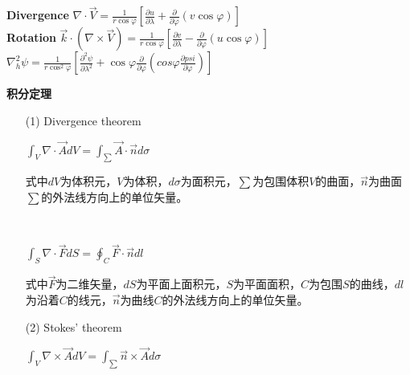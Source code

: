 \documentclass[cn, twoside]{myModel}
\begin{document}
\begin{cnabstract}
\begin{itemize}
\begin{itemize}
				\textbf{Divergence}
				$\nabla\cdot\overrightarrow{V}=\frac{1}{r\cos{\varphi}}[\frac{\partial u}{\partial \lambda}+\frac{\partial}{\partial \varphi}(v\cos{\varphi})]$ \\
				\textbf{Rotation}
				$\overrightarrow{k}\cdot(\nabla\times\overrightarrow{V})=\frac{1}{r\cos{\varphi}}[\frac{\partial v}{\partial \lambda}-\frac{\partial}{\partial \varphi}(u\cos{\varphi})]$ \quad
				$\nabla^2_{h}\psi=\frac{1}{r\cos^2{\varphi}}[\frac{\partial^2 \psi}{\partial \lambda^2}+\cos{\varphi}\frac{\partial}{\partial \varphi}(cos{\varphi}\frac{\partial psi}{\partial \varphi})]$
			\end{itemize}
		\end{itemize}
		\par{}\noindent{}\textcolor{blue!70!black}{\textbf{积分定理}}
			\normalsize
			\begin{itemize}
				\item[(1)] Divergence theorem \\
				\begin{minipage}{6cm}
					\centering
					{$\displaystyle\int_{V} \nabla\cdot\overrightarrow{A}dV=\displaystyle\int_{\sum} \overrightarrow{A}\cdot\overrightarrow{n}d\sigma$}
				\end{minipage}
				\begin{minipage}{9.5cm}
					\raggedright
					{
						式中$dV$为体积元，$V$为体积，$d\sigma$为面积元，$\sum$为包围体积$V$的曲面，$\overrightarrow{n}$为曲面$\sum$的外法线方向上的单位矢量。
					}
				\end{minipage} \\ [.5em]
				\begin{minipage}{6cm}
					\centering
					{$\displaystyle\int_{S}\nabla\cdot\overrightarrow{F}dS
					=\displaystyle\oint_{C} \overrightarrow{F}\cdot\overrightarrow{n}dl$}
				\end{minipage}
				\begin{minipage}{9.5cm}
					\raggedright
					{
						式中$\overrightarrow{F}$为二维矢量，$dS$为平面上面积元，$S$为平面面积，$C$为包围$S$的曲线，$dl$为沿着$C$的线元，$\overrightarrow{n}$为曲线$C$的外法线方向上的单位矢量。
					}
				\end{minipage}
				\item[(2)] Stokes' theorem \\
				\begin{minipage}{6cm}
					\centering
					{$\displaystyle\int_{V}\nabla\times\overrightarrow{A}dV
					 =\displaystyle\int_{\sum}\overrightarrow{n}\times\overrightarrow{A}d\sigma$}\\

\end{minipage}
\end{itemize}
\end{cnabstract}
\end{document}
